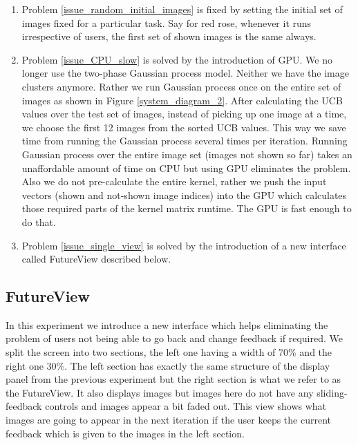 \documentclass[english]{tktltiki}
\begin{document}
\begin{enumerate}
	\item Problem \ref{issue_random_initial_images} is fixed by setting the initial set of images fixed for a particular task. Say for red rose, whenever it runs irrespective of users, the first set of shown images is the same always.
	\item Problem \ref{issue_CPU_slow} is solved by the introduction of GPU. We no longer use the two-phase Gaussian process model. Neither we have the image clusters anymore. Rather we run Gaussian process once on the entire set of images as shown in Figure \ref{system_diagram_2}. After calculating the UCB values over the test set of images, instead of picking up one image at a time, we choose the first 12 images from the sorted UCB values. This way we save time from running the Gaussian process several times per iteration. Running Gaussian process over the entire image set (images not shown so far) takes an unaffordable amount of time on CPU but using GPU eliminates the problem. Also we do not pre-calculate the entire kernel, rather we push the input vectors (shown and not-shown image indices) into the GPU which calculates those required parts of the kernel matrix runtime. The GPU is fast enough to do that.
	\item Problem \ref{issue_single_view} is solved by the introduction of a new interface called FutureView described below.
 
\end{enumerate}


\subsection{FutureView}

In this experiment we introduce a new interface which helps eliminating the problem of users not being able to go back and change feedback if required. We split the screen into two sections, the left one having a width of 70\% and the right one 30\%. The left section has exactly the same structure of the display panel from the previous experiment but the right section is what we refer to as the FutureView. It also displays images but images here do not have any sliding-feedback controls and images appear a bit faded out. This view shows what images are going to appear in the next iteration if the user keeps the current feedback which is given to the images in the left section.
\end{document}
